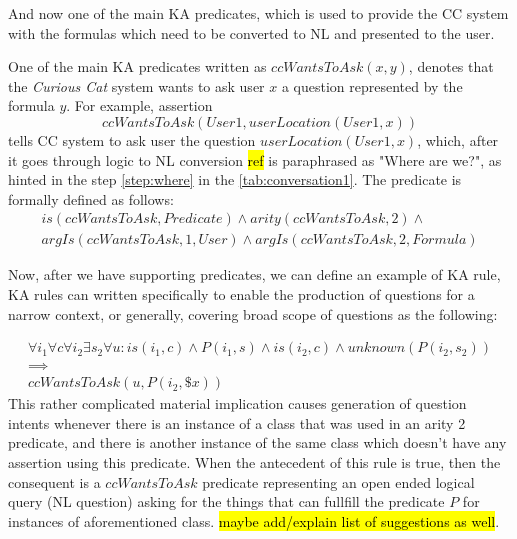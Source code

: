 And now one of the main KA predicates, which is used to provide the CC system
with the formulas which need to be converted to NL and presented to the user.

\begin{definition}\label{def:pred_ccWantsToAsk}
One of the main KA predicates written as $ccWantsToAsk(x,y)$, denotes that the 
\emph{Curious Cat} system wants to ask user $x$ a question represented by the
formula $y$. For example, assertion 
\begin{equation*}
ccWantsToAsk(User1, userLocation(User1,x))
\end{equation*}
tells CC system to ask user the question $userLocation(User1,x)$, which,
after it goes through logic to NL conversion \hl{ref} is paraphrased as
"Where are we?", as hinted in the step \ref{step:where} in the 
\autoref{tab:conversation1}. The predicate is formally defined as follows:
\begin{equation}\label{as:ccWantsToAsk}
\begin{gathered}
	is(ccWantsToAsk,Predicate) \land arity(ccWantsToAsk,2) \land\\ 
	argIs(ccWantsToAsk,1,User) \land argIs(ccWantsToAsk,2,Formula)
\end{gathered}
\end{equation}
\end{definition}

Now, after we have supporting predicates, we can define an example of KA rule, 
KA rules can written specifically to enable the production of questions for a 
narrow context, or generally, covering broad scope of questions as the
following:

\begin{equation}\label{as:generalRule}
\begin{gathered}
\forall i_1 \forall c \forall i_2 \exists s_2 \forall u:is(i_1,c) \land P(i_1,s) \land is(i_2,c)\land unknown(P(i_2,s_2)) \\ 
	\implies \\
ccWantsToAsk(u,P(i_2,\$x))
\end{gathered}
\end{equation}
This rather complicated material implication causes generation of question 
intents whenever there is an instance of a class that was used in an arity 2 
predicate, and there is another instance of the same class which doesn’t have 
any assertion using this predicate. When the antecedent of this rule is true,
then the consequent is a $ccWantsToAsk$ predicate representing an open
ended logical query (NL question) asking for the things that can fullfill the
predicate $P$ for instances of aforementioned class. \hl{maybe add/explain
list of suggestions as well}.

